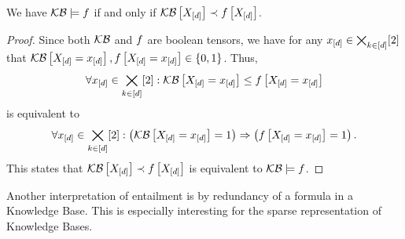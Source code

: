\begin{theorem} \label{the:orderingEntailmentCriterion}
	We have $\mathcal{KB}\models f$ if and only if $\mathcal{KB}\left[X_{[d]}\right]\prec f\left[X_{[d]}\right]$.
\end{theorem}
\begin{proof}
	Since both $\mathcal{KB}$ and $f$ are boolean tensors, we have for any $x_{[d]}\in\bigtimes_{k\in[d]}[2]$ that $\mathcal{KB}\left[X_{[d]}=x_{[d]}\right],f\left[X_{[d]}=x_{[d]}\right]\in\{0,1\}$.
	Thus,
	\begin{align*}
		\forall{x_{[d]}\in\bigtimes_{k\in[d]}[2]}:{\mathcal{KB}\left[X_{[d]}=x_{[d]}\right]\leq f\left[X_{[d]}=x_{[d]}\right]}
	\end{align*}
	is equivalent to
	\begin{align*}
		\forall{x_{[d]}\in\bigtimes_{k\in[d]}[2]}:{\left(\mathcal{KB}\left[X_{[d]}=x_{[d]}\right]=1\right)\Rightarrow\left(f\left[X_{[d]}=x_{[d]}\right]=1\right)} \, .
	\end{align*}
	This states that $\mathcal{KB}\left[X_{[d]}\right]\prec f\left[X_{[d]}\right]$ is equivalent to $\mathcal{KB}\models f$.
\end{proof}




Another interpretation of entailment is by redundancy of a formula in a Knowledge Base.
This is especially interesting for the sparse representation of Knowledge Bases.

